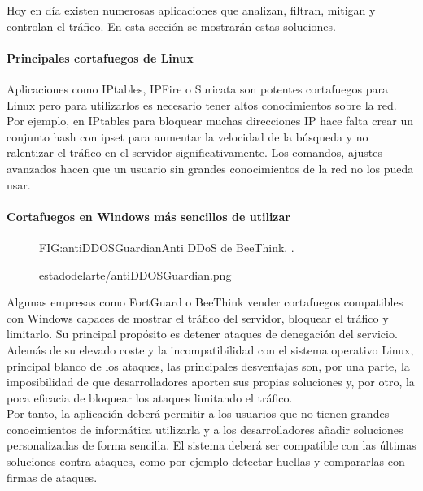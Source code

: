Hoy en día existen numerosas aplicaciones que analizan, filtran, mitigan y controlan el tráfico. En esta sección se mostrarán estas soluciones.

\paragraph{Principales cortafuegos de Linux}
Aplicaciones como IPtables, IPFire o Suricata son potentes cortafuegos para Linux pero para utilizarlos es necesario tener altos conocimientos sobre la red. Por ejemplo, en IPtables para bloquear muchas direcciones IP hace falta crear un conjunto hash con ipset para aumentar la velocidad de la búsqueda y no ralentizar el tráfico en el servidor significativamente. Los comandos, ajustes avanzados hacen que un usuario sin grandes conocimientos de la red no los pueda usar.

\paragraph{Cortafuegos en Windows más sencillos de utilizar}



\begin{figure}[Anti DDoS de BeeThink.]{FIG:antiDDOSGuardian}{Anti DDoS de BeeThink. \cite{antiDDOSGuardian}.}
  \begin{image}{}{}{estadodelarte/antiDDOSGuardian.png}
  \end{image}
\end{figure}

Algunas empresas como FortGuard o BeeThink vender cortafuegos compatibles con Windows capaces de mostrar el tráfico del servidor, bloquear el tráfico y limitarlo. Su principal propósito es detener ataques de denegación del servicio. Además de su elevado coste y la incompatibilidad con el sistema operativo Linux, principal blanco de los ataques, las principales desventajas son, por una parte, la imposibilidad de que desarrolladores aporten sus propias soluciones y, por otro, la poca eficacia de bloquear los ataques limitando el tráfico.
\\Por tanto, la aplicación deberá permitir a los usuarios que no tienen grandes conocimientos de informática utilizarla y a los desarrolladores añadir soluciones personalizadas de forma sencilla. El sistema deberá ser compatible con las últimas soluciones contra ataques, como por ejemplo detectar huellas y compararlas con firmas de ataques.